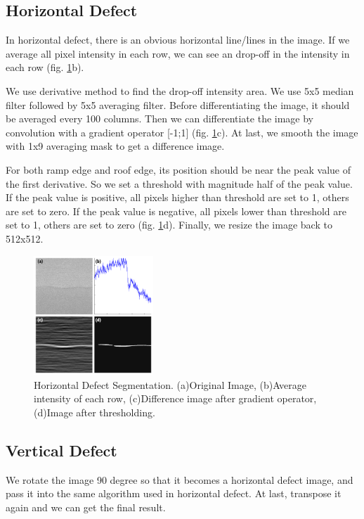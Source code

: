 \documentclass[conference]{IEEEtran}
\begin{document}
\begin{CJK}{UTF8}{bsmi}
\subsection{Horizontal Defect}
In horizontal defect, there is an obvious horizontal line/lines in the image. If we average all pixel intensity in each row, we can see an drop-off in the intensity in each row (fig. \ref{fig:Horizontal}b).

We use derivative method to find the drop-off intensity area. We use 5x5 median filter followed by 5x5 averaging filter. Before differentiating the image, it should be averaged every 100 columns. Then we can differentiate the image by convolution with a gradient operator [-1;1] (fig. \ref{fig:Horizontal}c). At last, we smooth the image with 1x9 averaging mask to get a difference image.

For both ramp edge and roof edge, its position should be near the peak value of the first derivative. So we set a threshold with magnitude half of the peak value. If the peak value is positive, all pixels higher than threshold are set to 1, others are set to zero. If the peak value is negative, all pixels lower than threshold are set to 1, others are set to zero (fig. \ref{fig:Horizontal}d). Finally, we resize the image back to 512x512.

\begin{figure}[!htbp]
\centerline{\includegraphics[width=0.4\textwidth]{../figures/Horizon.png}}
\caption{Horizontal Defect Segmentation. (a)Original Image, (b)Average intensity of each row, (c)Difference image after gradient operator, (d)Image after thresholding.}
\label{fig:Horizontal}
\end{figure}

\subsection{Vertical Defect}
We rotate the image 90 degree so that it becomes a horizontal defect image, and pass it into the same algorithm used in horizontal defect. At last, transpose it again and we can get the final result.


\end{CJK}
\end{document}
